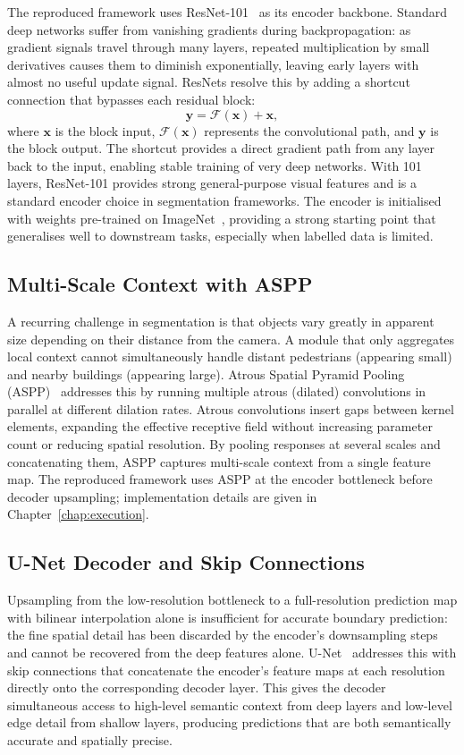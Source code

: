 The reproduced framework uses ResNet-101~\cite{he2016deep} as its
encoder backbone.
Standard deep networks suffer from vanishing gradients during
backpropagation: as gradient signals travel through many layers, repeated
multiplication by small derivatives causes them to diminish exponentially,
leaving early layers with almost no useful update signal. ResNets resolve
this by adding a shortcut connection that bypasses each residual block:
\[
    \mathbf{y} = \mathcal{F}(\mathbf{x}) + \mathbf{x},
\]
where $\mathbf{x}$ is the block input, $\mathcal{F}(\mathbf{x})$
represents the convolutional path, and $\mathbf{y}$ is the block output.
The shortcut provides a direct gradient path from any layer back to
the input, enabling stable training of very deep networks. With 101
layers, ResNet-101 provides strong general-purpose visual features and
is a standard encoder choice in segmentation frameworks. The encoder is
initialised with weights pre-trained on
ImageNet~\cite{deng2009imagenet}, providing a strong starting point that
generalises well to downstream tasks, especially when labelled data is limited.

\subsection{Multi-Scale Context with ASPP}

A recurring challenge in segmentation is that objects vary greatly in
apparent size depending on their distance from the camera. A module that
only aggregates local context cannot simultaneously handle distant
pedestrians (appearing small) and nearby buildings (appearing large).
Atrous Spatial Pyramid Pooling
(ASPP)~\cite{chen2018encoder} addresses this by running multiple
atrous (dilated) convolutions in parallel at different dilation rates.
Atrous convolutions insert gaps between kernel elements, expanding the
effective receptive field without increasing parameter count or reducing
spatial resolution. By pooling responses at several scales and
concatenating them, ASPP captures multi-scale context from a single
feature map. The reproduced framework uses ASPP at the encoder bottleneck before
decoder upsampling; implementation details are given in
Chapter~\ref{chap:execution}.

\subsection{U-Net Decoder and Skip Connections}

Upsampling from the low-resolution bottleneck to a full-resolution
prediction map with bilinear interpolation alone is insufficient for
accurate boundary prediction: the fine spatial detail has been discarded
by the encoder's downsampling steps and cannot be recovered from the
deep features alone. U-Net~\cite{ronneberger2015u} addresses this
with skip connections that concatenate the encoder's feature maps at each
resolution directly onto the corresponding decoder layer. This gives the
decoder simultaneous access to high-level semantic context from deep
layers and low-level edge detail from shallow layers, producing
predictions that are both semantically accurate and spatially precise.

